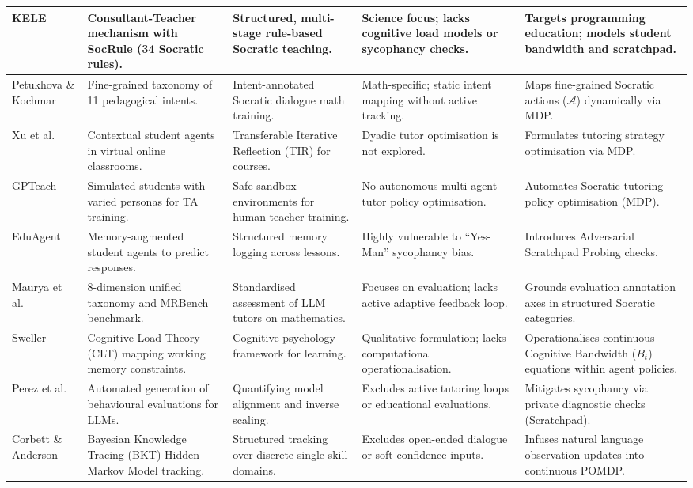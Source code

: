 \documentclass[11pt,a4paper]{report}
\begin{document}
{\begin{longtable}{@{}P{0.15\textwidth}P{0.22\textwidth}P{0.16\textwidth}P{0.18\textwidth}P{0.17\textwidth}@{}}
\midrule
KELE \cite{peng2025kele} & Consultant-Teacher mechanism with SocRule (34 Socratic rules). & Structured, multi-stage rule-based Socratic teaching. & Science focus; lacks cognitive load models or sycophancy checks. & Targets programming education; models student bandwidth and scratchpad. \\
\midrule
Petukhova \& Kochmar \cite{petukhova2025intent} & Fine-grained taxonomy of 11 pedagogical intents. & Intent-annotated Socratic dialogue math training. & Math-specific; static intent mapping without active tracking. & Maps fine-grained Socratic actions ($\mathcal{A}$) dynamically via MDP. \\
\midrule
Xu et al. \cite{xu2025classroom} & Contextual student agents in virtual online classrooms. & Transferable Iterative Reflection (TIR) for courses. & Dyadic tutor optimisation is not explored. & Formulates tutoring strategy optimisation via MDP. \\
\midrule
GPTeach \cite{markel2023gpteach} & Simulated students with varied personas for TA training. & Safe sandbox environments for human teacher training. & No autonomous multi-agent tutor policy optimisation. & Automates Socratic tutoring policy optimisation (MDP). \\
\midrule
EduAgent \cite{xu2024eduagent} & Memory-augmented student agents to predict responses. & Structured memory logging across lessons. & Highly vulnerable to ``Yes-Man'' sycophancy bias. & Introduces Adversarial Scratchpad Probing checks. \\
\midrule
Maurya et al. \cite{maurya2025unifying} & 8-dimension unified taxonomy and MRBench benchmark. & Standardised assessment of LLM tutors on mathematics. & Focuses on evaluation; lacks active adaptive feedback loop. & Grounds evaluation annotation axes in structured Socratic categories. \\
\midrule
Sweller \cite{sweller1988cognitive} & Cognitive Load Theory (CLT) mapping working memory constraints. & Cognitive psychology framework for learning. & Qualitative formulation; lacks computational operationalisation. & Operationalises continuous Cognitive Bandwidth ($B_t$) equations within agent policies. \\
\midrule
Perez et al. \cite{perez2022discovering} & Automated generation of behavioural evaluations for LLMs. & Quantifying model alignment and inverse scaling. & Excludes active tutoring loops or educational evaluations. & Mitigates sycophancy via private diagnostic checks (Scratchpad). \\
\midrule
Corbett \& Anderson \cite{corbett1994knowledge} & Bayesian Knowledge Tracing (BKT) Hidden Markov Model tracking. & Structured tracking over discrete single-skill domains. & Excludes open-ended dialogue or soft confidence inputs. & Infuses natural language observation updates into continuous POMDP. \\
\end{longtable}
}
\end{document}
